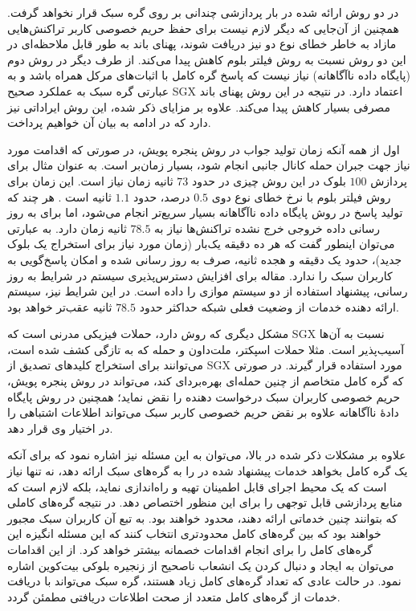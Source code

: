 در دو روش ارائه شده در \cite{Matetic2019} بار پردازشی چندانی بر روی گره سبک قرار نخواهد گرفت. همچنین از آن‌جایی که دیگر لازم نیست برای حفظ حریم خصوصی کاربر تراکنش‌هایی مازاد به خاطر خطای نوع دو نیز دریافت شوند، پهنای باند به طور قابل ملاحظه‌ای در این دو روش نسبت به روش فیلتر بلوم کاهش پیدا می‌کند. از طرف دیگر در روش دوم (پایگاه داده ناآگاهانه) نیاز نیست که پاسخ گره کامل با اثبات‌های مرکل همراه باشد و به عبارتی گره سبک به عملکرد صحیح SGX اعتماد دارد. در نتیجه در این روش پهنای باند مصرفی بسیار کاهش پیدا می‌کند. علاوه بر مزایای ذکر شده، این روش ایراداتی نیز دارد که در ادامه به بیان آن خواهیم پرداخت.

اول از همه آنکه زمان تولید جواب در روش پنجره پویش، در صورتی که اقدامت مورد نیاز جهت جبران حمله کانال جانبی انجام شود، بسیار زمان‌بر است. به عنوان مثال برای پردازش  $100$ بلوک در این روش چیزی در حدود $73$ ثانیه زمان نیاز است. این زمان برای روش فیلتر بلوم با نرخ خطای نوع دوی $0.5$ درصد، حدود $1.1$ ثانیه است \cite{Matetic2019}. هر چند که تولید پاسخ در روش  پایگاه داده ناآگاهانه بسیار سریع‌تر انجام می‌شود، اما برای به روز رسانی داده خروجی‌ خرج نشده تراکنش‌ها نیاز به $78.5$ ثانیه زمان دارد. به عبارتی می‌توان اینطور گفت که هر ده دقیقه یک‌بار (زمان مورد نیاز برای استخراج یک بلوک جدید)، حدود یک دقیقه و هجده ثانیه،‌ صرف به روز رسانی شده و امکان پاسخ‌گویی به کاربران سبک را ندارد. مقاله \cite{Matetic2019} برای افزایش دسترس‌پذیری سیستم در شرایط به روز رسانی، پیشنهاد استفاده از دو سیستم موازی را داده است. در این شرایط نیز،‌ سیستم ارائه دهنده خدمات از وضعیت فعلی شبکه حداکثر حدود $78.5$ ثانیه عقب‌تر خواهد بود.

مشکل دیگری که روش \cite{Matetic2019} دارد، حملات فیزیکی مدرنی است که SGX نسبت به آن‌ها آسیب‌پذیر است. مثلا حملات اسپکتر\cite{Kocher2019}، ملت‌داون\cite{Lipp2020} و حمله \cite{Bulck2020} که به تازگی کشف شده است، می‌توانند برای استخراج کلید‌های تصدیق از ‌SGX مورد استفاده قرار گیرند. در صورتی که گره کامل متخاصم از چنین حمله‌ای بهره‌بردای کند، می‌تواند در روش پنجره پویش، حریم خصوصی کاربران سبک درخواست دهنده را نقض نماید؛ همچنین در روش پایگاه دادهٔ ناآگاهانه علاوه بر نقض حریم خصوصی کاربر سبک می‌تواند اطلاعات اشتباهی را در اختیار وی قرار دهد.

علاوه بر مشکلات ذکر شده در بالا، می‌توان به این مسئله نیز اشاره نمود که برای آنکه یک گره کامل بخواهد خدمات پیشنهاد شده در \cite{Matetic2019} را به گره‌های سبک ارائه دهد، نه تنها نیاز است که یک محیط اجرای قابل اطمینان تهیه و راه‌اندازی نماید، بلکه لازم است که منابع پردازشی قابل توجهی را برای این منظور اختصاص دهد. در نتیجه گره‌های کاملی که بتوانند چنین خدماتی ارائه دهند، محدود خواهند بود. به تبع آن کاربران سبک مجبور خواهند بود که بین گره‌های کامل محدود‌تری انتخاب کنند که این مسئله انگیزه این گره‌های کامل را برای انجام اقدامات خصمانه بیشتر خواهد کرد. از این اقدامات می‌توان به ایجاد و دنبال کردن یک انشعاب ناصحیح از زنجیره بلوکی بیت‌کوین اشاره نمود. در حالت عادی که تعداد گره‌های کامل زیاد هستند، گره سبک می‌تواند با دریافت خدمات از گره‌های کامل متعدد از صحت اطلاعات دریافتی مطمئن گردد.

